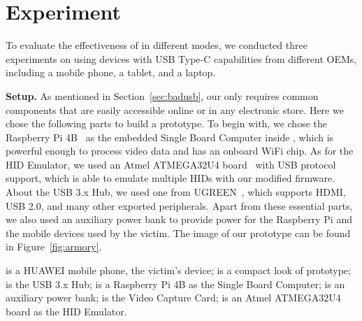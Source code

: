 \section{Experiment}
\label{sec:experiment}


To evaluate the effectiveness of \tool in different modes, we conducted three
experiments on \tool using devices with \ac{USB} Type-C capabilities from different
\acp{OEM}, including a mobile phone, a tablet, and a laptop.

\textbf{Setup.}
As mentioned in Section~\ref{sec:badusb},
our \tool only requires common components that are easily accessible online or
in any electronic store. Here we chose the following parts to build a
prototype. To begin with, we chose the Raspberry Pi 4B~\cite{pi4b} as the embedded Single Board
Computer inside \tool, which is powerful enough to process video data and has
an onboard WiFi chip. As for the \ac{HID} Emulator, we used an Atmel ATMEGA32U4 board~\cite{atmel}
with \ac{USB} protocol support, which is able to emulate multiple \acp{HID}
with our modified firmware. About the \ac{USB} 3.x Hub, we used one from
UGREEN~\cite{ugreen}, which supports HDMI, \ac{USB} 2.0, and many other exported peripherals.
Apart from these essential parts, we also used an auxiliary power bank to
provide power for the Raspberry Pi and the mobile devices used by the victim.
The image of our \tool prototype can be found in Figure~\ref{fig:armory}.

 is a HUAWEI mobile phone, the victim's device;  is a compact look of \tool prototype;  is the \ac{USB} 3.x Hub;  is a Raspberry Pi 4B as the Single Board Computer;  is an auxiliary power bank;  is the Video Capture Card;  is an Atmel ATMEGA32U4 board as the \ac{HID} Emulator.


